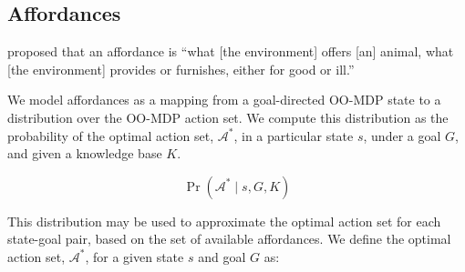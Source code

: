 \documentclass[conference]{IEEEtran}
\begin{document}



\subsection{Affordances}

\citet{gibson77} proposed that an affordance is ``what [the
  environment] offers [an] animal, what [the environment] provides or
furnishes, either for good or ill.''  

We model affordances as a mapping from a goal-directed OO-MDP state to
a distribution over the OO-MDP action set. We compute this distribution as the probability of the optimal
action set, $\mathcal{A}^*$, in a particular state $s$, under a goal $G$, and given a knowledge base $K$.

\begin{equation}
\Pr(\mathcal{A}^* \mid s, G, K)
\label{eq:master}
\end{equation}

This distribution may be used to approximate the optimal action set for each 
state-goal pair, based on the set of available affordances. We define the optimal
action set, $\mathcal{A}^*$, for a given state $s$ and goal $G$ as:
\end{document}

